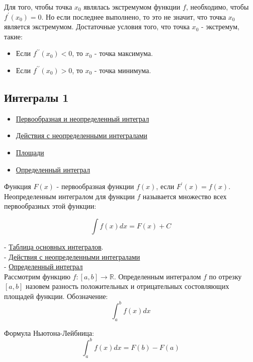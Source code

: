 \documentclass{article}
\begin{document}
Для того, чтобы точка $x_0$ являлась экстремумом функции $f$, необходимо, чтобы $f^{\prime}(x_0) = 0$. Но если последнее выполнено, то это не значит, что точка $x_0$ является экстремумом. Достаточные условия того, что точка $x_0$ - экстремум, такие:

\begin{itemize}
	\item Если $f^{\prime \prime}(x_0) < 0$, то $x_0$ - точка максимума.
	\item Если $f^{\prime \prime}(x_0) > 0$, то $x_0$ - точка минимума.
\end{itemize}

\subsection{Интегралы 1}

\begin{itemize}
	\item \href{https://stepik.org/lesson/28376/step/1}{Первообразная и неопределенный интеграл}
	\item \href{https://stepik.org/lesson/28377/step/1}{Действия с неопределенными интегралами}
	\item \href{https://stepik.org/lesson/28378/step/2}{Площади}
	\item \href{https://stepik.org/lesson/28379/step/1}{Определенный интеграл}
\end{itemize}

Функция $F(x)$ - первообразная функции $f(x)$, если $F^{\prime}(x) = f(x)$. \\

Неопределенным интегралом для функции $f$ называется множество всех первообразных этой функции:

$$ \int f(x) dx = F(x) + C $$

- \href{https://stepik.org/lesson/28376/step/3}{Таблица основных интегралов}. \\
- \href{https://stepik.org/lesson/28377/step/2}{Действия с неопределенными интегралами} \\
- \href{https://stepik.org/lesson/28379/step/2}{Определенный интеграл} \\

Рассмотрим функцию $f : [a, b] \to \mathbb{R}$. Определенным интегралом $f$ по отрезку $[a, b]$ назовем разность положительных и отрицательных состовляющих площадей функции. Обозначение: $$ \int_{a}^{b} f(x) dx $$

Формула Ньютона-Лейбница: $$ \int_{a}^{b} f(x) dx = F(b) - F(a) $$
\end{document}
